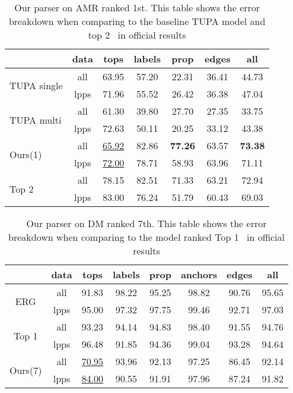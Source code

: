 \begin{table}[!ht]
\small
\centering
\setlength{\tabcolsep}{3pt}
\begin{tabular}{lcccccc}
\toprule
                          & data & tops              & labels & prop  & edges & all   \\ \hline
\multirow{2}{*}{ \parbox{1cm}{TUPA
single} }                 & all  & 63.95             & 57.20  & 22.31 & 36.41 & 44.73 \\
                          & lpps & 71.96             & 55.52  & 26.42 & 36.38 & 47.04 \\ \hline
\multirow{2}{*}{ \parbox{1cm}{TUPA
multi} }                  & all  & 61.30             & 39.80  & 27.70 & 27.35 & 33.75 \\
                          & lpps & 72.63             & 50.11  & 20.25 & 33.12 & 43.38 \\ \hline
\multirow{2}{*}{ Ours(1)} & all  & \underline{65.92} & 82.86  & {\bf 77.26} & 63.57 & {\bf 73.38} \\
                          & lpps & \underline{72.00} & 78.71  & 58.93 & 63.96 & 71.11 \\ \hline
\multirow{2}{*}{ Top 2}  & all  & 78.15             & 82.51  & 71.33 & 63.21 & 72.94 \\
                          & lpps & 83.00             & 76.24  & 51.79 & 60.43 & 69.03 \\ \bottomrule
\end{tabular}
\caption{\label{tbl:results_amr} Our parser on AMR ranked 1st. This table shows the error breakdown when comparing to the baseline TUPA model and top 2~\cite{Che:Dou:Xu:19} in official results}
\end{table}


\begin{table}[!h]
\small
\centering
\setlength{\tabcolsep}{2.5pt}
\begin{tabular}{cccccccc}
  \toprule
                            & data & tops              & labels & prop  & anchors & edges & all   \\ \hline
  \multirow{2}{*}{ ERG }    & all  & 91.83             & 98.22  & 95.25 & 98.82   & 90.76 & 95.65 \\
                            & lpps & 95.00             & 97.32  & 97.75 & 99.46   & 92.71 & 97.03 \\
  \multirow{2}{*}{Top 1}    & all  & 93.23             & 94.14  & 94.83 & 98.40   & 91.55 & 94.76 \\
                            & lpps & 96.48             & 91.85  & 94.36 & 99.04   & 93.28 & 94.64 \\
  \multirow{2}{*}{ Ours(7)} & all  & \underline{70.95} & 93.96  & 92.13 & 97.25   & 86.45 & 92.14 \\
                            & lpps & \underline{84.00} & 90.55  & 91.91 & 97.96   & 87.24 & 91.82 \\ \bottomrule
\end{tabular}
\caption{\label{tbl:results_dm} Our parser on DM ranked 7th. This table shows the error breakdown when comparing to the model ranked Top 1~\cite{Li:Zha:Zha:19} in official results}
\end{table}




